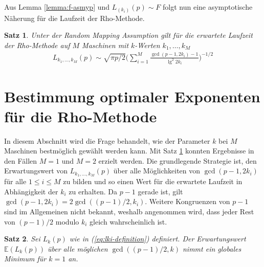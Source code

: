 \documentclass[a4paper, 11pt, ngerman]{article}
\newcommand{\E}{\mathbb{E}}
\theoremstyle{definition}
\theoremstyle{plain}
\newtheorem{theorem}{Satz}
\theoremstyle{remark}
\begin{document}
Aus Lemma \ref{lemma:f-asmyp} und $L_{(k_i)}(p) \sim F$ folgt nun eine asymptotische Näherung für die Laufzeit der Rho-Methode.
\begin{theorem}
    Unter der Random Mapping Assumption gilt für die erwartete Laufzeit der Rho-Methode auf $M$ Maschinen mit $k$-Werten $k_1, \dots, k_M$
    \begin{align}
        L_{k_1, \dots, k_M}(p) \sim
        \sqrt{\pi p / 2} \Bigg ( \sum_{i = 1}^M
        \frac {\gcd(p - 1, 2k_i) - 1} {\lg^2 2k_i} \Bigg )^{-1/2}
        \label{eq:lki-asymp}
    \end{align}

    \label{theorem:lki-asymp}
\end{theorem}

\section{Bestimmung optimaler Exponenten für die Rho-Methode}
\label{sec:optimal-k}

In diesem Abschnitt wird die Frage behandelt, wie der Parameter $k$ bei $M$ Maschinen bestmöglich gewählt werden kann. Mit Satz \ref{theorem:lki-asymp} konnten Ergebnisse in den Fällen $M = 1$ und $M = 2$ erzielt werden. Die grundlegende Strategie ist, den Erwartungswert von $L_{k_1, \dots, k_M}(p)$ über alle Möglichkeiten von $\gcd(p - 1, 2k_i)$ für alle $1 \le i \le M$ zu bilden und so einen Wert für die erwartete Laufzeit in Abhängigkeit der $k_i$ zu erhalten. Da $p - 1$ gerade ist, gilt $\gcd(p-1, 2k_i) = 2\gcd((p - 1)/2, k_i)$. Weitere Kongruenzen von $p - 1$ sind im Allgemeinen nicht bekannt, weshalb angenommen wird, dass jeder Rest von $(p- 1)/2$ modulo $k_i$ gleich wahrscheinlich ist.

\begin{theorem}
    \label{theorem:optimal-k-m1}
    Sei $L_k(p)$ wie in (\ref{eq:lki-definition}) definiert. Der Erwartungswert $\E(L_k(p))$ über alle möglichen $\gcd((p - 1)/2, k)$ nimmt ein globales Minimum für $k = 1$ an.
\end{theorem}
\end{document}
